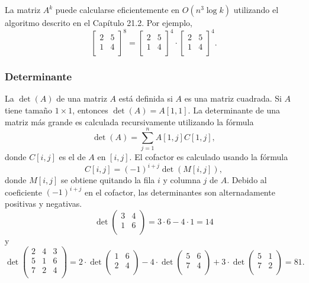 La matriz $A^k$ puede calcularse eficientemente en  $O(n^3 \log k)$
utilizando el algoritmo descrito en el Capítulo 21.2. Por ejemplo,
\[
    \begin{bmatrix}
        2 & 5 \\
        1 & 4 \\
    \end{bmatrix}^8 =
    \begin{bmatrix}
        2 & 5 \\
        1 & 4 \\
    \end{bmatrix}^4 \cdot
    \begin{bmatrix}
        2 & 5 \\
        1 & 4 \\
    \end{bmatrix}^4.
\]

\subsubsection{Determinante}


La  $\det(A)$ de una matriz $A$ está definida si $A$ es
una matriz cuadrada. Si $A$ tiene tamaño $1 \times 1$, entonces
$\det(A)=A[1,1]$. La determinante de una matriz más grande es calculada
recursivamente utilizando la fórmula
\[\det(A)=\sum_{j=1}^n A[1,j] C[1,j],\]
donde $C[i,j]$ es el  de $A$ en $[i,j]$.
El cofactor es calculado usando la fórmula
\[C[i,j] = (-1)^{i+j} \det(M[i,j]),\]
donde $M[i,j]$ se obtiene quitando la fila $i$ y columna $j$ de $A$. Debido
al coeficiente $(-1)^{i+j}$ en el cofactor, las determinantes son
alternadamente positivas y negativas.
\[
    \det
    \begin{pmatrix}
        3 & 4 \\
        1 & 6 \\
    \end{pmatrix}
    = 3 \cdot 6 - 4 \cdot 1 = 14
\]
y
\[
    \det
    \begin{pmatrix}
        2 & 4 & 3 \\
        5 & 1 & 6 \\
        7 & 2 & 4 \\
    \end{pmatrix}
    =
    2 \cdot
    \det
    \begin{pmatrix}
        1 & 6 \\
        2 & 4 \\
    \end{pmatrix}
    -4 \cdot
    \det
    \begin{pmatrix}
        5 & 6 \\
        7 & 4 \\
    \end{pmatrix}
    +3 \cdot
    \det
    \begin{pmatrix}
        5 & 1 \\
        7 & 2 \\
    \end{pmatrix}
    = 81.
\]

